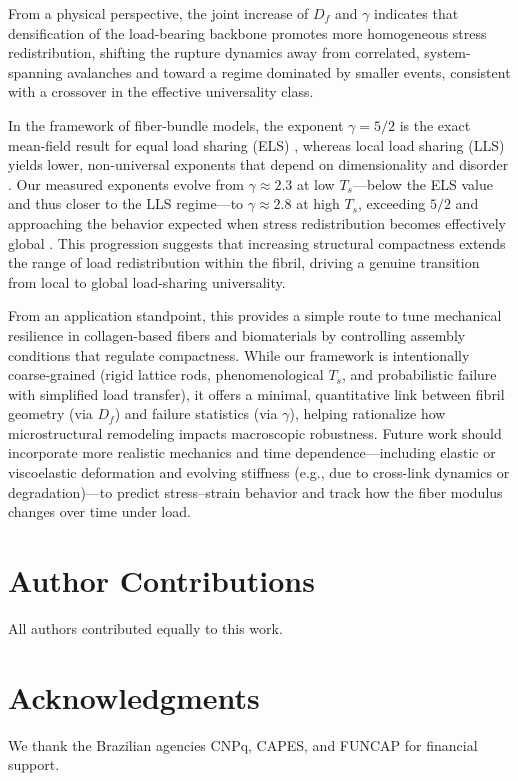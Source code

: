 \documentclass[aps,physrev,preprint,groupedaddress,linenumbers]{revtex4-2}
\begin{document}
From a physical perspective, the joint increase of $D_f$ and $\gamma$ indicates that densification of the load-bearing backbone promotes more homogeneous stress redistribution, shifting the rupture dynamics away from correlated, system-spanning avalanches and toward a regime dominated by smaller events, consistent with a crossover in the effective universality class. 

In the framework of fiber-bundle models, the exponent $\gamma=5/2$ is the exact mean-field result for equal load sharing (ELS) \cite{Hemmer1992,Hansen1994,Kloster1997}, whereas local load sharing (LLS) yields lower, non-universal exponents that depend on dimensionality and disorder \cite{Hidalgo2002,Pradhan2005,Biswas2013,Danku2018}. Our measured exponents evolve from $\gamma\approx 2.3$ at low $T_s$---below the ELS value and thus closer to the LLS regime---to $\gamma\approx 2.8$ at high $T_s$, exceeding $5/2$ and approaching the behavior expected when stress redistribution becomes effectively global \cite{Pradhan2010}. This progression suggests that increasing structural compactness extends the range of load redistribution within the fibril, driving a genuine transition from local to global load-sharing universality. 

From an application standpoint, this provides a simple route to tune mechanical resilience in collagen-based fibers and biomaterials by controlling assembly conditions that regulate compactness. While our framework is intentionally coarse-grained (rigid lattice rods, phenomenological $T_s$, and probabilistic failure with simplified load transfer), it offers a minimal, quantitative link between fibril geometry (via $D_f$) and failure statistics (via $\gamma$), helping rationalize how microstructural remodeling impacts macroscopic robustness. Future work should incorporate more realistic mechanics and time dependence---including elastic or viscoelastic deformation and evolving stiffness (e.g., due to cross-link dynamics or degradation)---to predict stress--strain behavior and track how the fiber modulus changes over time under load.

\section{Author Contributions}
All authors contributed equally to this work.

\section{Acknowledgments}
We thank the Brazilian agencies CNPq, CAPES, and FUNCAP for financial support.
\end{document}
